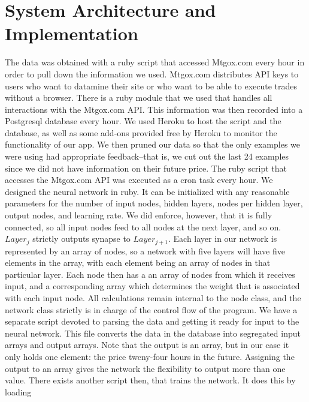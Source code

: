 \documentclass[a4paper,11pt]{article}
\begin{document}
\section{System Architecture and Implementation}
The data was obtained with a ruby script that accessed Mtgox.com every hour in order to pull down the information we used.
Mtgox.com distributes API keys to users who want to datamine their site or who want to be able to execute trades without
a browser.  There is a ruby module that we used that handles all interactions with the Mtgox.com API.
This information was then recorded into a Postgresql database every hour.  We used Heroku to host the script and the database, as 
well as some add-ons provided free by Heroku to monitor the functionality of our app.  
We then pruned our data so that the only examples we were using had appropriate feedback--that is, we cut out the last 24 examples
since we did not have information on their future price.  The ruby script that accesses the Mtgox.com API was executed as a cron
task every hour.  
\newline \newline We designed the neural network in ruby.  It can be initialized with any reasonable parameters
for the number of input nodes, hidden layers, nodes per hidden layer, output nodes, and learning rate.  We did enforce, however,
that it is fully connected, so all input nodes feed to all nodes at the next layer, and so on.  $Layer_{j}$ strictly outputs
synapse to $Layer_{j + 1}$.  Each layer in our network is represented by an array of nodes, so a network with five layers
will have five elements in the array, with each element being an array of nodes in that particular layer.  Each node then
has a an array of nodes from which it receives input, and a corresponding array which determines the weight that is associated
with each input node.  All calculations remain internal to the node class, and the network class strictly is in charge
of the control flow of the program.
\newline \newline
We have a separate script devoted to parsing the data and getting it ready for input to the neural network.  This file converts
the data in the database into segregated input arrays and output arrays.  Note that the output is an array, but in our case it
only holds one element: the price tweny-four hours in the future.  Assigning the output to an array gives the network the
flexibility to output more than one value.  There exists another script then, that trains the network.  It does this by loading
\end{document}
